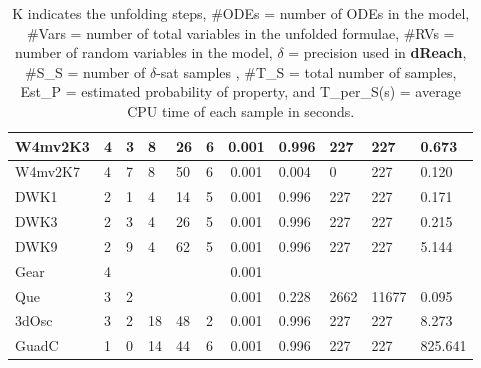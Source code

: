 \begin{table}[h]
\begin{tabular}{|l|l|l|l|l|l|c|l|l|l|l|}
    W4mv2K3       & 4       & 3 & 8      & 26     & 6     & 0.001 & 0.996      & 227         & 227        & 0.673          \\ \hline
    W4mv2K7       & 4       & 7 & 8      & 50     & 6     & 0.001 & 0.004     & 0         & 227        & 0.120               \\ \hline
    DWK1      & 2       & 1 & 4      & 14    & 5     & 0.001 & 0.996  & 227       & 227      & 0.171           \\ \hline
    DWK3      & 2       & 3 & 4      & 26    & 5     & 0.001 & 0.996  & 227       & 227      & 0.215           \\ \hline
    DWK9      & 2       & 9 & 4      & 62    & 5     & 0.001 & 0.996  & 227       & 227      & 5.144           \\ \hline
    Gear      & 4       & ~ & ~      & ~     & ~     & 0.001 & ~      & ~         & ~        & ~               \\ \hline
    Que       & 3       & 2 & ~      & ~     & ~     & 0.001 & 0.228      & 2662         & 11677        & 0.095       \\ \hline
    3dOsc     & 3       & 2 & 18      & 48     & 2     & 0.001 & 0.996      & 227         & 227        & 8.273      \\ \hline
    GuadC     & 1       & 0 & 14      & 44     & 6     & 0.001 & 0.996      & 227         & 227        & 825.641     \\ \hline
    \end{tabular}
    \caption {K indicates the unfolding steps, \#ODEs = number of ODEs in the model, \#Vars = number of total variables in the unfolded formulae, \#RVs = number of random variables in the model, $\delta$ = precision used in 
{\bf dReach}, \#S\_S = number of $\delta$-sat samples , \#T\_S = total number of samples, Est\_P = estimated 
probability of property, and T\_per\_S(s) = average CPU time of each sample in seconds.}
    \label{table:exp}
\end{table}
